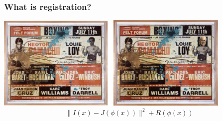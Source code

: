 \begin{frame}
\frametitle{What is registration?}
\includegraphics[height=1.8in]{../Art/RegistrationBasquiatDeWarp.pdf}
\vskip20pt
\begin{displaymath}
\| I ( x ) - J(\phi(x)) \|^2  + R(\phi( x))
\end{displaymath}
\end{frame}

